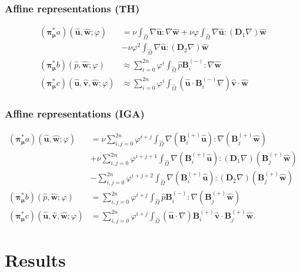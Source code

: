 \documentclass{beamer}
\begin{document}
\begin{frame}
  \frametitle{Affine representations (TH)}
  \begin{align*}
    ({\bm\pi}^*_{\bm\mu}a)(\hat{\bm u}, \hat{\bm w}; \varphi) &=
    \nu \int_{\hat{\Omega}} \nabla \hat{\bm u} : \nabla \hat{\bm w}
    + \nu \varphi \int_{\hat{\Omega}}
    \nabla \hat{\bm u} : (\bm D_1 \nabla) \hat{\bm w} \\
    &- \nu \varphi^2 \int_{\hat{\Omega}}
    \nabla \hat{\bm u} : (\bm D_2 \nabla) \hat{\bm w} \\
    ({\bm\pi}^*_{\bm\mu}b)(\hat{p}, \hat{\bm w}; \varphi) &\approx \sum_{i=0}^{2n} \varphi^i
    \int_{\hat{\Omega}} \hat{p} \bm B^{(-)}_i : \nabla \hat{\bm w} \\
    ({\bm\pi}^*_{\bm\mu}c)(\hat{\bm u}, \hat{\bm v}, \hat{\bm w}; \varphi)
    &\approx \sum_{i=0}^{2n} \varphi^i \int_{\hat{\Omega}}
    (\hat{\bm u} \cdot \bm B^{(-)}_i \nabla) \hat{\bm v} \cdot \hat{\bm w}
  \end{align*}
\end{frame}

\begin{frame}
  \frametitle{Affine representations (IGA)}

  \begin{align*}
  ({\bm\pi}^*_{\bm\mu}a)(\hat{\bm u}, \hat{\bm w}; \varphi)
    &= \nu \sum_{i,j=0}^{2n} \varphi^{i+j} \int_{\hat{\Omega}}
      \nabla (\bm B^{(+)}_i \hat{\bm u}) : \nabla (\bm B^{(+)}_j \hat{\bm w}) \\
    &+ \nu \sum_{i,j=0}^{2n} \varphi^{i+j+1} \int_{\hat{\Omega}}
      \nabla (\bm B^{(+)}_i \hat{\bm u}) : (\bm D_1 \nabla) (\bm B^{(+)}_j \hat{\bm w}) \\
    &- \sum_{i,j=0}^{2n} \varphi^{i+j+2} \int_{\hat{\Omega}}
      \nabla (\bm B^{(+)}_i \hat{\bm u}) : (\bm D_2 \nabla) (\bm B^{(+)}_j \hat{\bm w}) \\
  ({\bm\pi}^*_{\bm\mu}b)(\hat{p}, \hat{\bm w}; \varphi) &= \sum_{i,j=0}^{2n} \varphi^{i+j}
      \int_{\hat{\Omega}} \hat{p} \bm B^{(-)}_i :
      \nabla \left( \bm B^{(+)}_j \hat{\bm w} \right) \\
  ({\bm\pi}^*_{\bm\mu}c)(\hat{\bm u}, \hat{\bm v}, \hat{\bm w}; \varphi)
  &= \sum_{i,j=0}^{2n} \varphi^{i+j}
    \int_{\hat{\Omega}} (\hat{\bm u} \cdot \nabla) \bm B^{(+)}_i \hat{\bm v} \cdot \bm B^{(+)}_j \hat{\bm w}.
  \end{align*}
\end{frame}

\section{Results}
\end{document}
